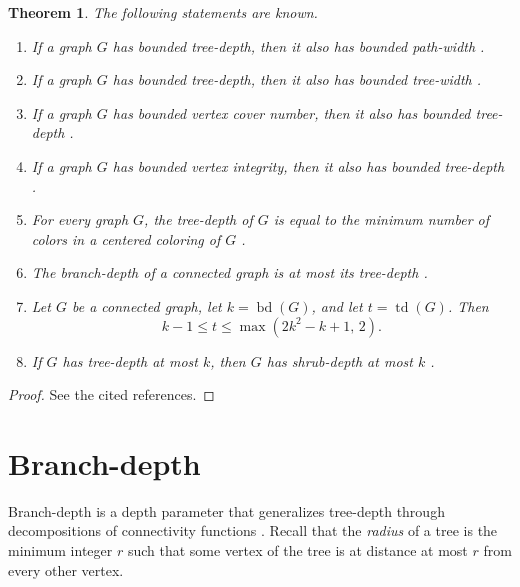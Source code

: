 \documentclass[10pt]{book}
\newtheorem{theorem}{Theorem}[section]
\theoremstyle{definition}
\begin{document}
\begin{theorem}
The following statements are known.
\begin{enumerate}
    \item If a graph \(G\) has bounded tree-depth, then it also has bounded path-width \cite{311}.

    \item If a graph \(G\) has bounded tree-depth, then it also has bounded tree-width \cite{311}.

    \item If a graph \(G\) has bounded vertex cover number, then it also has bounded tree-depth \cite{Hanaka2024CoreSI}.

    \item If a graph \(G\) has bounded vertex integrity, then it also has bounded tree-depth \cite{Hanaka2024CoreSI}.

    \item For every graph \(G\), the tree-depth of \(G\) is equal to the minimum number of colors in a centered coloring of \(G\) \cite{Nesetril2006TreedepthSC}.

    \item The branch-depth of a connected graph is at most its tree-depth \cite{91}.

    \item Let \(G\) be a connected graph, let \(k=\operatorname{bd}(G)\), and let \(t=\operatorname{td}(G)\). Then
    \[
    k-1 \leq t \leq \max(2k^2-k+1,\,2).
    \]
    \cite{91}

    \item If \(G\) has tree-depth at most \(k\), then \(G\) has shrub-depth at most \(k\) \cite{350}.
\end{enumerate}
\end{theorem}

\begin{proof}
See the cited references.
\end{proof}

\section{Branch-depth}

Branch-depth is a depth parameter that generalizes tree-depth through decompositions of connectivity functions \cite{91}.  
Recall that the \emph{radius} of a tree is the minimum integer \(r\) such that some vertex of the tree is at distance at most \(r\) from every other vertex.
\end{document}
